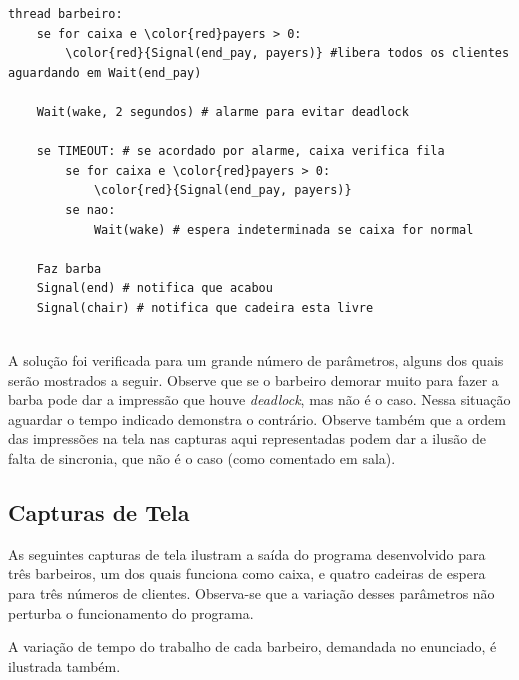\documentclass{article}
\begin{document}
\begin{Verbatim}[commandchars=\\\{\}]
    thread barbeiro:
    se for caixa e \color{red}payers > 0: 
        \color{red}{Signal(end_pay, payers)} #libera todos os clientes aguardando em Wait(end_pay)
    
    Wait(wake, 2 segundos) # alarme para evitar deadlock
    
    se TIMEOUT: # se acordado por alarme, caixa verifica fila
        se for caixa e \color{red}payers > 0:
            \color{red}{Signal(end_pay, payers)}
        se nao:
            Wait(wake) # espera indeterminada se caixa for normal
    
    Faz barba
    Signal(end) # notifica que acabou
    Signal(chair) # notifica que cadeira esta livre
    

\end{Verbatim}

A solução foi verificada para um grande número de parâmetros, alguns dos quais serão mostrados a seguir. Observe que se o barbeiro demorar muito para fazer a barba pode dar a impressão que houve \textit{deadlock}, mas não é o caso. Nessa situação aguardar o tempo indicado demonstra o contrário. Observe também que a ordem das impressões na tela nas capturas aqui representadas podem dar a ilusão de falta de sincronia, que não é o caso (como comentado em sala).

\subsection{Capturas de Tela}

As seguintes capturas de tela ilustram a saída do programa desenvolvido para três barbeiros, um dos quais funciona como caixa, e quatro cadeiras de espera para três números de clientes. Observa-se que a variação desses parâmetros não perturba o funcionamento do programa.

A variação de tempo do trabalho de cada barbeiro, demandada no enunciado, é ilustrada também.
\end{document}
